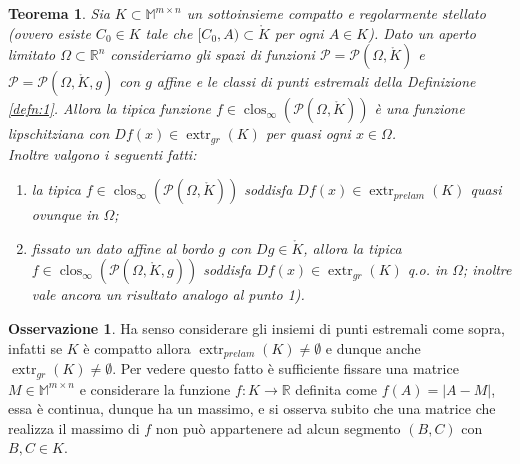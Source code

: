 \documentclass[a4paper,11pt]{book}
\theoremstyle{plain}
\newtheorem{teo}{Teorema}[chapter]
\theoremstyle{definition}
\newtheorem{oss}[defn]{Osservazione}
\theoremstyle{remark}
\newcommand{\R}{\mathbb{R}}
\newcommand{\M}{\mathbb{M}}
\DeclareMathOperator{\clos}{clos}
\DeclareMathOperator{\extr}{extr}
\begin{document}
\begin{teo}
	Sia $K\subset \M^{m\times n}$ un sottoinsieme compatto e regolarmente stellato (ovvero esiste $C_0\in K$ tale che $[C_0,A)\subset \mathring{K}$ per ogni $A\in K$). Dato un aperto limitato $\Omega\subset \R^n$ consideriamo gli spazi di funzioni $\mathscr{P}=\mathscr{P}(\Omega,\mathring{K})$ e $\mathscr{P}=\mathscr{P}(\Omega,\mathring{K},g)$ con $g$ affine e le classi di punti estremali della Definizione \ref{defn:1}. Allora la tipica funzione $f\in\clos_{\infty}(\mathscr{P}(\Omega,\mathring{K}))$ è una funzione lipschitziana con $Df(x)\in\extr_{gr}(K)$ per quasi ogni $x\in\Omega$.\\
	Inoltre valgono i seguenti fatti:
	\begin{enumerate}[1)]
		\item la tipica $f\in\clos_{\infty}(\mathscr{P}(\Omega,\mathring{K}))$ soddisfa $Df(x)\in\extr_{prelam}(K)$ quasi ovunque in $\Omega$;
		\item fissato un dato affine al bordo $g$ con $Dg\in\mathring{K}$, allora la tipica $f\in\clos_{\infty}(\mathscr{P}(\Omega,\mathring{K},g))$ soddisfa $Df(x)\in\extr_{gr}(K)$ q.o. in $\Omega$; inoltre vale ancora un risultato analogo al punto \textit{1)}.
	\end{enumerate}
\end{teo}
\begin{oss}
	Ha senso considerare gli insiemi di punti estremali come sopra, infatti se $K$ è compatto allora $\extr_{prelam}(K)\neq \emptyset$ e dunque anche $\extr_{gr}(K)\neq\emptyset$. Per vedere questo fatto è sufficiente fissare una matrice $M\in\M^{m\times n}$ e considerare la funzione $f:K\to\R$ definita come $f(A) = |A-M|$, essa è continua, dunque ha un massimo, e si osserva subito che una matrice che realizza il massimo di $f$ non può appartenere ad alcun segmento $(B,C)$ con $B,C\in K$. 
\end{oss}
\end{document}
